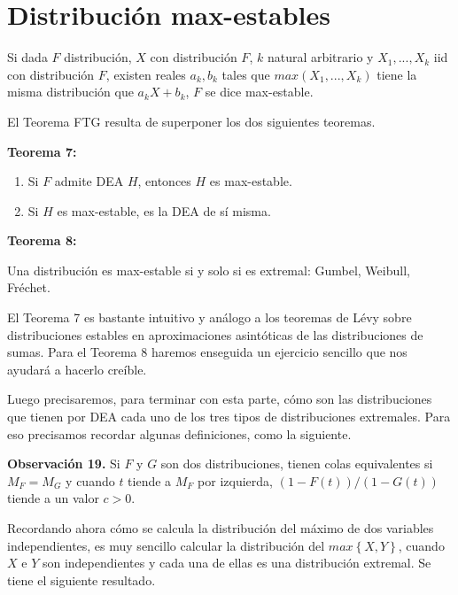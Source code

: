 \documentclass[
  20pt,
]{book}
\theoremstyle{definition}
\theoremstyle{definition}
\theoremstyle{definition}
\theoremstyle{definition}
\theoremstyle{remark}
\begin{document}
\section{Distribución max-estables}\label{distribuciuxf3n-max-estables}

Si dada \(F\) distribución, \(X\) con distribución \(F\), \(k\) natural
arbitrario y \(X_1,...,X_k\) iid con distribución \(F\), existen
reales \(a_k, b_k\) tales que \(max(X_1,...,X_k)\) tiene la misma
distribución que \(a_k X+ b_k\), \(F\) se dice max-estable.

El Teorema FTG resulta de superponer los dos
siguientes teoremas.

\textbf{Teorema 7:}

\begin{enumerate}
\def\labelenumi{\alph{enumi})}
\item
  Si \(F\) admite DEA \(H\), entonces \(H\) es max-estable.
\item
  Si \(H\) es max-estable, es la DEA de sí misma.
\end{enumerate}

\textbf{Teorema 8:}

Una distribución es max-estable si y solo si es extremal: Gumbel, Weibull, Fréchet.

El Teorema 7 es bastante intuitivo y análogo a los
teoremas de Lévy sobre distribuciones estables en
aproximaciones asintóticas de las distribuciones de
sumas. Para el Teorema 8 haremos enseguida un
ejercicio sencillo que nos ayudará a hacerlo creíble.

Luego precisaremos, para terminar con esta parte,
cómo son las distribuciones que tienen por DEA
cada uno de los tres tipos de distribuciones
extremales. Para eso precisamos recordar algunas
definiciones, como la siguiente.

\textbf{Observación 19.} Si \(F\) y \(G\) son dos distribuciones,
tienen colas equivalentes si \(M_F=M_G\) y cuando \(t\)
tiende a \(M_F\) por izquierda, \((1-F(t))/(1-G(t))\) tiende a
un valor \(c>0\).

Recordando ahora cómo se calcula la distribución
del máximo de dos variables independientes, es
muy sencillo calcular la distribución del \(max\left\{ X,Y \right\}\),
cuando \(X\) e \(Y\) son independientes y cada una de
ellas es una distribución extremal. Se tiene el
siguiente resultado.
\end{document}
